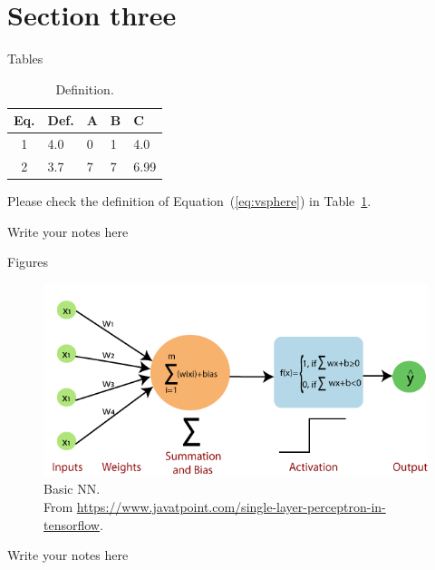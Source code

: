 \documentclass{beamer}
\begin{document}
\section{Section three}
    \begin{frame}{Tables}
        \begin{table}[ht!]
            \centering
            \caption{Definition.}
            \label{tab:table}
            \begin{tabular}{cllll}\toprule
                Eq. & Def. & A & B & C \\\midrule
                1 & 4.0 & 0 & 1 & 4.0 \\
                2 & 3.7 & 7 & 7 & 6.99 \\\bottomrule
            \end{tabular}
        \end{table}
        \normalsize Please check the definition of Equation~(\ref{eq:vsphere}) in Table~\ref{tab:table}.
        
        \begin{note}
            {Write your notes here}
        \end{note}
    \end{frame}
    
    \begin{frame}{Figures}   
        \begin{figure}[ht!]
            \centering
            \includegraphics[width=0.86\linewidth]{pic/single-layer-perceptron-in-tensorflow2.png}
            \caption{Basic NN. \\
            From \url{https://www.javatpoint.com/single-layer-perceptron-in-tensorflow}.}
        \end{figure}

        \begin{note}
            {Write your notes here}
        \end{note}
    \end{frame}
   
\end{document}
